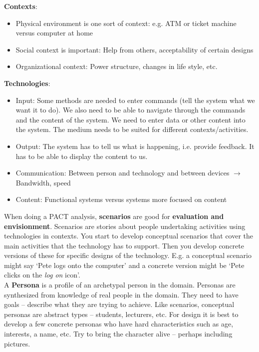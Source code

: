 \textbf{Contexts}:
\begin{itemize}
\item Physical environment is one sort of context: e.g. ATM or ticket machine versus computer at home
\item Social context is important: Help from others, acceptability of certain designs
\item Organizational context: Power structure, changes in life style, etc.
\end{itemize}
\textbf{Technologies}: 
\begin{itemize}
\item Input: Some methods are needed to enter commands (tell the system what we want it to do). We also need to be able to navigate through the commands and the content of the system. We need to enter data or other content into the system. The medium needs to be suited for different contexts/activities.
\item Output: The system has to tell us what is happening, i.e. provide feedback. It has to be able to display the content to us. 
\item Communication: Between person and technology and between devices $\rightarrow$ Bandwidth, speed
\item Content: Functional systems versus systems more focused on content
\end{itemize}
When doing a PACT analysis, \textbf{scenarios} are good for \textbf{evaluation and envisionment}. Scenarios are stories about people undertaking activities using technologies in contexts. You start to develop conceptual scenarios that cover the main activities that the technology has to support. Then you develop concrete versions of these for specific designs of the technology. E.g. a conceptual scenario might say `Pete logs onto the computer' and a concrete version might be `Pete clicks on the \textit{log on} icon'.\\
A \textbf{Persona} is a profile of an archetypal person in the domain. Personas are synthesized from knowledge of real people in the domain. They need to have goals -- describe what they are trying to achieve. Like scenarios, conceptual personas are abstract types -- students, lecturers, etc. For design it is best to develop a few concrete personas who have hard characteristics such as age, interests, a name, etc. Try to bring the character alive -- perhaps including pictures.


